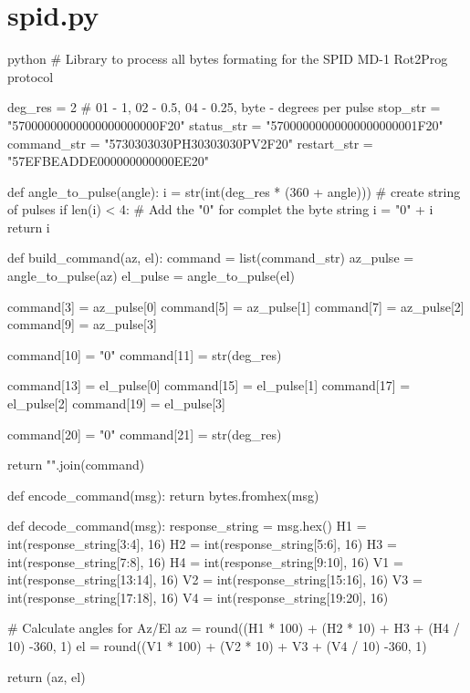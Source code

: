 \section*{spid.py}

\begin{sourcecode}[]{python}{}
    # Library to process all bytes formating for the SPID MD-1 Rot2Prog protocol

    deg_res = 2 # 01 - 1, 02 - 0.5, 04 - 0.25, byte - degrees per pulse
    stop_str = "57000000000000000000000F20"
    status_str = "57000000000000000000001F20"
    command_str = "5730303030PH30303030PV2F20"
    restart_str = "57EFBEADDE000000000000EE20"
    
    def angle_to_pulse(angle):
        i = str(int(deg_res * (360 + angle))) # create string of pulses
        if len(i) < 4: # Add the "0" for complet the byte string
            i = "0" + i
        return i
    
    def build_command(az, el):
        command = list(command_str)
        az_pulse = angle_to_pulse(az)
        el_pulse = angle_to_pulse(el)
    
        command[3] = az_pulse[0]
        command[5] = az_pulse[1]
        command[7] = az_pulse[2]
        command[9] = az_pulse[3]
    
        command[10] = "0"
        command[11] = str(deg_res)
    
        command[13] = el_pulse[0]
        command[15] = el_pulse[1]
        command[17] = el_pulse[2]
        command[19] = el_pulse[3]
    
        command[20] = "0"
        command[21] = str(deg_res)
        
        return "".join(command)
    
    def encode_command(msg):
        return bytes.fromhex(msg)
    
    def decode_command(msg):
        response_string = msg.hex()
        H1 = int(response_string[3:4], 16)
        H2 = int(response_string[5:6], 16)
        H3 = int(response_string[7:8], 16)
        H4 = int(response_string[9:10], 16)
        V1 = int(response_string[13:14], 16)
        V2 = int(response_string[15:16], 16)
        V3 = int(response_string[17:18], 16)
        V4 = int(response_string[19:20], 16)
    
        # Calculate angles for Az/El
        az = round((H1 * 100) + (H2 * 10) + H3 + (H4 / 10) -360, 1)
        el = round((V1 * 100) + (V2 * 10) + V3 + (V4 / 10) -360, 1)
    
        return (az, el)    
\end{sourcecode}

